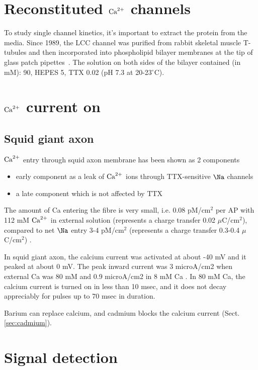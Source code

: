 \section{Reconstituted ${\text{Ca}^{2+}}$ channels}
\label{sec:reconstitute_LCC}

To study single channel kinetics, it's important to extract the protein from the
media. Since 1989, the LCC channel was purified from rabbit skeletal muscle
T-tubules and then incorporated into phospholipid bilayer membranes at the tip
of glass patch pipettes~\citep{mcdonald1989}. The solution on both sides of the
bilayer contained (in mM):  90, HEPES 5, TTX 0.02 (pH 7.3 at
20-23$^\circ$C).


\section{${\text{Ca}^{2+}}$ current on}
\label{sec:calcium-current-on}

\subsection{Squid giant axon }
\label{sec:calcium-current-on-axon}

${\text{Ca}^{2+}}$ entry through squid axon membrane has been shown as 2 components
\begin{itemize}
  \item early component as a leak of ${\text{Ca}^{2+}}$ ions through TTX-sensitive $\Na$
  channels
  
  \item a late component which is not affected by TTX
\end{itemize}
The amount of Ca entering the fibre is very small, i.e. 0.08 pM/cm$^2$ per AP
with 112 mM ${\text{Ca}^{2+}}$ in external solution (represents a charge transfer 0.02
$\mu$C/cm$^2$), compared to net $\Na$ entry 3-4 pM/cm$^2$ (represents a charge
transfer 0.3-0.4 $\mu$C/cm$^2$) \citep{meves1973cic}.

In squid giant axon, the calcium current was activated at about -40 mV and it
peaked at about 0 mV. The peak inward current was 3 microA/cm2 when external Ca
was 80 mM and 0.9 microA/cm2 in 8 mM Ca \citep{dipolo1983}.
In 80 mM Ca, the calcium current is turned on in less than 10 msec, and it does
not decay appreciably for pulses up to 70 msec in duration.

Barium can replace calcium, and cadmium blocks the calcium current
(Sect.\ref{sec:cadmium}).

\section{Signal detection}

